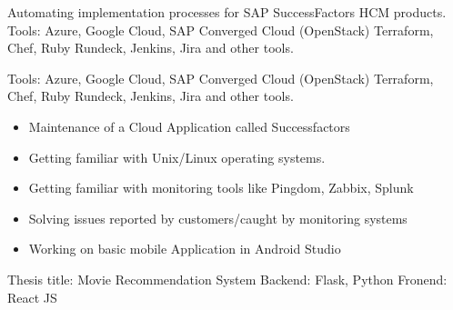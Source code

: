 \documentclass[10pt,a4paper,ragged2e,withhyper]{altacv}
\begin{document}
\begin{paracol}{2}

\begin{outline}
\1 Automating implementation processes for SAP SuccessFactors HCM products.
\1 Tools: 
\2 Azure, Google Cloud, SAP Converged Cloud (OpenStack)
\2 Terraform, Chef, Ruby
\2 Rundeck, Jenkins, Jira and other tools. 
\end{outline}
\divider

\begin{outline}
\1 Tools: 
\2 Azure, Google Cloud, SAP Converged Cloud (OpenStack)
\2 Terraform, Chef, Ruby
\2 Rundeck, Jenkins, Jira and other tools. 
\end{outline}
\divider

\begin{itemize}
\item Maintenance of a Cloud Application called Successfactors
\item Getting familiar with Unix/Linux operating systems.
\item Getting familiar with monitoring tools like Pingdom, Zabbix, Splunk
\item Solving issues reported by customers/caught by monitoring systems 
\end{itemize}
\divider

\begin{itemize}
\item Working on basic mobile Application in Android Studio
\end{itemize}
\divider

\begin{outline}
\1 Thesis title: Movie Recommendation System
\2 Backend: Flask, Python
\2 Fronend: React JS
\end{outline}              
\medskip
\vspace{10mm}



\end{paracol}
\end{document}
